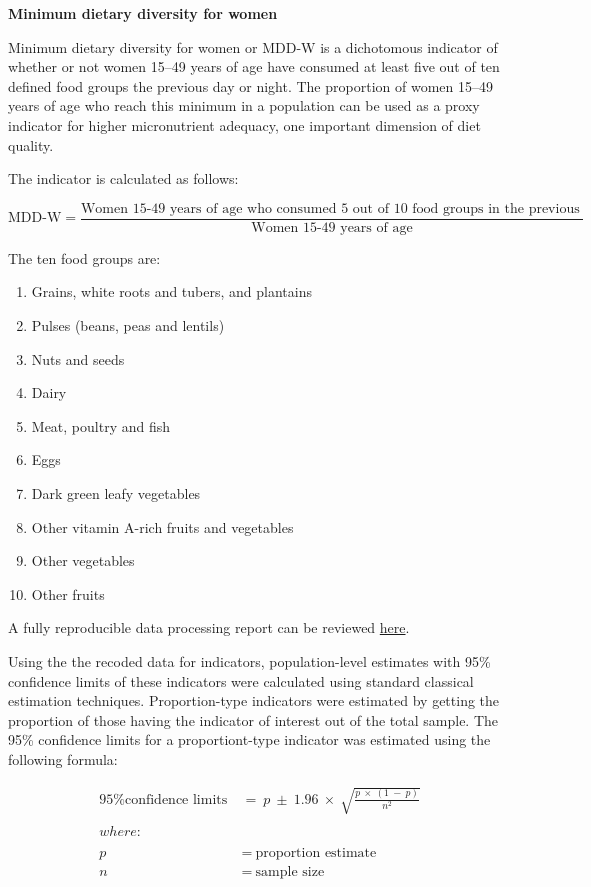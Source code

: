 \documentclass[12pt,a4paper]{article}
\providecommand{\tightlist}{%
  \setlength{\itemsep}{0pt}\setlength{\parskip}{0pt}}
\begin{document}
\textbf{Minimum dietary diversity for women}

Minimum dietary diversity for women or MDD-W is a dichotomous indicator of whether or not women 15--49 years of age have consumed at least five out of ten defined food groups the previous day or night. The proportion of women 15--49 years of age who reach this minimum in a population can be used as a proxy indicator for higher micronutrient adequacy, one important dimension of diet quality.

The indicator is calculated as follows:

\[ \text{MDD-W} = \frac{\text{Women 15-49 years of age who consumed 5 out of 10 food groups in the previous day or night}}{\text{Women 15-49 years of age}} \]

The ten food groups are:

\begin{enumerate}
\def\labelenumi{\arabic{enumi}.}
\tightlist
\item
  Grains, white roots and tubers, and plantains
\item
  Pulses (beans, peas and lentils)
\item
  Nuts and seeds
\item
  Dairy
\item
  Meat, poultry and fish
\item
  Eggs
\item
  Dark green leafy vegetables
\item
  Other vitamin A-rich fruits and vegetables
\item
  Other vegetables
\item
  Other fruits
\end{enumerate}

A fully reproducible data processing report can be reviewed \href{https://github.com/validmeasures/myanmarMCCTprocessing}{here}.

Using the the recoded data for indicators, population-level estimates with 95\% confidence limits of these indicators were calculated using standard classical estimation techniques. Proportion-type indicators were estimated by getting the proportion of those having the indicator of interest out of the total sample. The 95\% confidence limits for a proportiont-type indicator was estimated using the following formula:

\[
\begin{aligned}
\text{95\% confidence limits} & ~ = ~ p ~ \pm ~ 1.96 ~ \times ~ \sqrt{\frac{p ~ \times ~ (1 ~ - ~ p)}{n ^ 2}} \\
\\
where: & \\
\\
p & ~ = ~ \text{proportion estimate} \\
n & ~ = ~ \text{sample size}
\end{aligned}
\]
\end{document}
